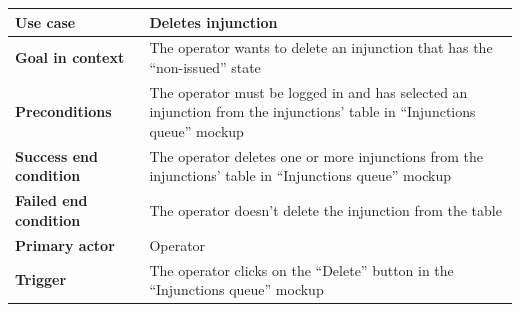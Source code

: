 {{{			\begin{table}[h]
			\begin{tabular}{|p{4cm}|p{10cm}|}
			\hline
				\centering \vspace{1mm} \bfseries{Use case} \vspace{1mm} & 
				\vspace{1mm} Deletes injunction\vspace{1mm}\\
			\hline
				\centering \vspace{1mm} \bfseries{Goal in context} \vspace{1mm} & 
				\vspace{1mm} The operator wants to delete an injunction that has the “non-issued” state \vspace{1mm}\\
			\hline
				\centering \vspace{1mm} \bfseries{Preconditions} \vspace{1mm} & 
				\vspace{1mm} The operator must be logged in and has selected an injunction from the injunctions’ table in “Injunctions queue” mockup \vspace{1mm}\\
			\hline
				\centering \vspace{1mm} \bfseries{Success end condition} \vspace{1mm} & 
				\vspace{1mm} The operator deletes one or more injunctions from the injunctions’ table in “Injunctions queue” mockup \vspace{1mm}\\
			\hline
				\centering \vspace{1mm} \bfseries{Failed end condition} \vspace{1mm} & 
				\vspace{1mm} The operator doesn’t delete the injunction from the table\vspace{1mm}\\
			\hline
				\centering \vspace{1mm} \bfseries{Primary actor} \vspace{1mm} & 
				\vspace{1mm} Operator \vspace{1mm}\\
			\hline
				\centering \vspace{1mm} \bfseries{Trigger} \vspace{1mm} & 
				\vspace{1mm} The operator clicks on the “Delete” button in the “Injunctions queue” mockup\vspace{1mm}\\
			\hline
			\end{tabular}
			\end{table}

}}}
